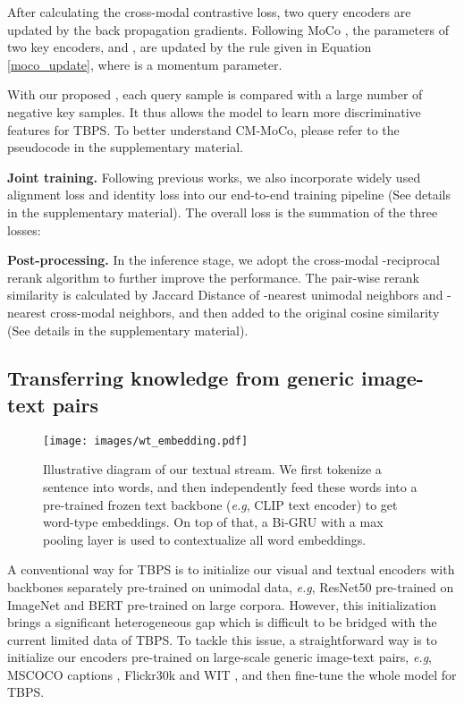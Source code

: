 \documentclass{bmvc2k}
\def\eg{\emph{e.g}\bmvaOneDot}
\newcommand{\revision}[1]{#1}
\newcommand{\statement}[1]{\noindent\textbf{#1}}
\begin{document}
After calculating the cross-modal contrastive loss, two query encoders are updated by the back propagation gradients. 
Following MoCo \cite{he2020moco}, the parameters of two key encoders,  and , are updated by the rule given in Equation \ref{moco_update}, where  is a momentum parameter.


With our proposed , each query sample is compared with a large number of negative key samples. 
It thus allows the model to learn more discriminative features for TBPS. 
To better understand CM-MoCo, please refer to the pseudocode in the supplementary material.

\statement{Joint training.} Following previous works, we also incorporate widely used alignment loss  \cite{wang2020vitaa} and identity loss  \cite{luo2019strong,zheng2020dual} into our end-to-end training pipeline (See details in the supplementary material). 
The overall loss  is the summation of the three losses:


\statement{Post-processing.} In the inference stage, we adopt the cross-modal -reciprocal rerank algorithm \cite{gao2021contextual} to further improve the performance. 
The pair-wise rerank similarity is calculated by Jaccard Distance of -nearest unimodal neighbors and -nearest cross-modal neighbors, and then added to the original cosine similarity (See details in the supplementary material).

\vspace*{-3mm}
\subsection{Transferring knowledge from generic image-text pairs}
\label{transfer}

\begin{figure}[t]
\centering
\texttt{[image: images/wt\_embedding.pdf]}
\caption{\revision{Illustrative diagram of our textual stream. We first tokenize a sentence into words, and then independently feed these words into a pre-trained frozen text backbone (\eg, CLIP text encoder) to get word-type embeddings. On top of that, a Bi-GRU with a max pooling layer is used to contextualize all word embeddings.}}
\label{wt_embedding}
\vspace*{-3mm}
\end{figure}
 A conventional way for TBPS is to initialize our visual and textual encoders with backbones separately pre-trained on unimodal data, \eg, ResNet50 \cite{he2016resnet} pre-trained on ImageNet \cite{deng2009imagenet} and BERT \cite{su2019vlbert} pre-trained on large corpora.
However, this initialization brings a significant heterogeneous gap which is difficult to be bridged with the current limited data of TBPS. 
To tackle this issue, a straightforward way is to initialize our encoders pre-trained on large-scale generic image-text pairs, \eg, MSCOCO captions \cite{lin2014coco}, Flickr30k \cite{plummer2015flickr30k} and WIT \cite{radford2021clip}, and then fine-tune the whole model for TBPS. 
\end{document}
